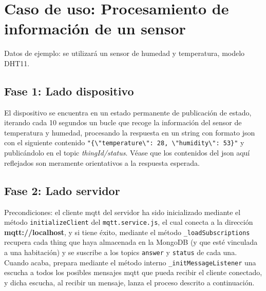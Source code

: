 \section{Caso de uso: Procesamiento de información de un sensor}
\label{ch:Capitulo5.4}
Datos de ejemplo: se utilizará un sensor de humedad y temperatura, modelo DHT11.

\subsection{Fase 1: Lado dispositivo}
\label{ch:Capitulo5.4.1}
El dispositivo se encuentra en un estado permanente de publicación de estado, iterando cada 10 segundos un bucle que recoge la información del sensor de temperatura y humedad, procesando la respuesta en un string con formato \gls{json} con el siguiente contenido \verb|"{\"temperature\": 28, \"humidity\": 53}"| y publicándolo en el topic \textit{thingId/status}. Véase que los contenidos del \gls{json} aquí reflejados son meramente orientativos a la respuesta esperada.

\subsection{Fase 2: Lado servidor}
\label{ch:Capitulo5.4.2}
Precondiciones: el cliente \gls{mqtt} del servidor ha sido inicializado mediante el método \verb|initializeClient| del \verb|mqtt.service.js|, el cual conecta a la dirección \textbf{mqtt://localhost}, y si tiene éxito, mediante el método \verb|_loadSubscriptions| recupera cada thing que haya almacenada en la MongoDB (y que esté vinculada a una habitación) y se suscribe a los topics \verb|answer| y \verb|status| de cada una. Cuando acaba, prepara mediante el método interno \verb|_initMessageListener| una escucha a todos los posibles mensajes \gls{mqtt} que pueda recibir el cliente conectado, y dicha escucha, al recibir un mensaje, lanza el proceso descrito a continuación.


